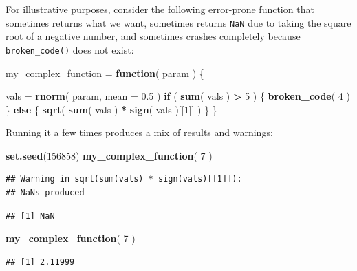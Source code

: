 \documentclass[
]{book}
\newenvironment{Shaded}{\begin{snugshade}}{\end{snugshade}}
\newcommand{\AttributeTok}[1]{\textcolor[rgb]{0.13,0.29,0.53}{#1}}
\newcommand{\ControlFlowTok}[1]{\textcolor[rgb]{0.13,0.29,0.53}{\textbf{#1}}}
\newcommand{\DecValTok}[1]{\textcolor[rgb]{0.00,0.00,0.81}{#1}}
\newcommand{\FloatTok}[1]{\textcolor[rgb]{0.00,0.00,0.81}{#1}}
\newcommand{\FunctionTok}[1]{\textcolor[rgb]{0.13,0.29,0.53}{\textbf{#1}}}
\newcommand{\NormalTok}[1]{#1}
\newcommand{\OtherTok}[1]{\textcolor[rgb]{0.56,0.35,0.01}{#1}}
\newcommand{\SpecialCharTok}[1]{\textcolor[rgb]{0.81,0.36,0.00}{\textbf{#1}}}
\begin{document}
For illustrative purposes, consider the following error-prone function that sometimes returns what we want, sometimes returns \texttt{NaN} due to taking the square root of a negative number, and sometimes crashes completely because \texttt{broken\_code()} does not exist:

\begin{Shaded}
\begin{Highlighting}[]
\NormalTok{my\_complex\_function }\OtherTok{=} \ControlFlowTok{function}\NormalTok{( param ) \{}
    
\NormalTok{    vals }\OtherTok{=} \FunctionTok{rnorm}\NormalTok{( param, }\AttributeTok{mean =} \FloatTok{0.5}\NormalTok{ )}
    \ControlFlowTok{if}\NormalTok{ ( }\FunctionTok{sum}\NormalTok{( vals ) }\SpecialCharTok{\textgreater{}} \DecValTok{5}\NormalTok{ ) \{}
        \FunctionTok{broken\_code}\NormalTok{( }\DecValTok{4}\NormalTok{ )}
\NormalTok{    \} }\ControlFlowTok{else}\NormalTok{ \{}
        \FunctionTok{sqrt}\NormalTok{( }\FunctionTok{sum}\NormalTok{( vals ) }\SpecialCharTok{*} \FunctionTok{sign}\NormalTok{( vals )[[}\DecValTok{1}\NormalTok{]] )}
\NormalTok{    \}}
\NormalTok{\}}
\end{Highlighting}
\end{Shaded}

Running it a few times produces a mix of results and warnings:

\begin{Shaded}
\begin{Highlighting}[]
\FunctionTok{set.seed}\NormalTok{(}\DecValTok{156858}\NormalTok{)}
\FunctionTok{my\_complex\_function}\NormalTok{( }\DecValTok{7}\NormalTok{ )}
\end{Highlighting}
\end{Shaded}

\begin{verbatim}
## Warning in sqrt(sum(vals) * sign(vals)[[1]]):
## NaNs produced
\end{verbatim}

\begin{verbatim}
## [1] NaN
\end{verbatim}

\begin{Shaded}
\begin{Highlighting}[]
\FunctionTok{my\_complex\_function}\NormalTok{( }\DecValTok{7}\NormalTok{ )}
\end{Highlighting}
\end{Shaded}

\begin{verbatim}
## [1] 2.11999
\end{verbatim}
\end{document}
